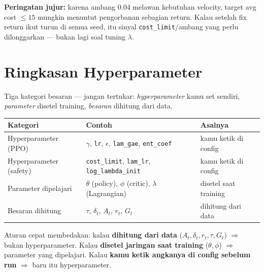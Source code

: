 \documentclass[11pt,a4paper]{article}
\begin{document}
\begin{catatan}
\textbf{Peringatan jujur:} karena ambang $0.04$ melawan kebutuhan velocity, target
avg cost $\le 15$ mungkin menuntut pengorbanan sebagian return. Kalau setelah fix
return ikut turun di semua seed, itu sinyal \texttt{cost\_limit}/ambang yang perlu
dilonggarkan --- bukan lagi soal tuning $\lambda$.
\end{catatan}

\section{Ringkasan Hyperparameter}
Tiga kategori besaran --- jangan tertukar: \emph{hyperparameter} kamu set sendiri,
\emph{parameter} disetel training, \emph{besaran} dihitung dari data.

\begin{center}
\begin{tabular}{lll}
\hline
\textbf{Kategori} & \textbf{Contoh} & \textbf{Asalnya} \\
\hline
Hyperparameter (PPO)    & $\gamma$, \texttt{lr}, $\epsilon$, \texttt{lam\_gae}, \texttt{ent\_coef} & kamu ketik di config \\
Hyperparameter (safety) & \texttt{cost\_limit}, \texttt{lam\_lr}, \texttt{log\_lambda\_init} & kamu ketik di config \\
Parameter dipelajari    & $\theta$ (policy), $\phi$ (critic), $\lambda$ (Lagrangian) & disetel saat training \\
Besaran dihitung        & $\tau$, $\delta_t$, $A_t$, $r_t$, $G_t$ & dihitung dari data \\
\hline
\end{tabular}
\end{center}

\bigskip
Aturan cepat membedakan: kalau \textbf{dihitung dari data} ($A_t,\delta_t,r_t,\tau,G_t$)
$\Rightarrow$ bukan hyperparameter. Kalau \textbf{disetel jaringan saat training}
($\theta,\phi$) $\Rightarrow$ parameter yang dipelajari. Kalau \textbf{kamu ketik angkanya
di config sebelum run} $\Rightarrow$ baru itu hyperparameter.
\end{document}
